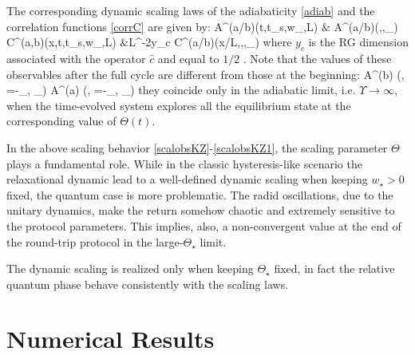 The corresponding dynamic scaling laws of the adiabaticity \eqref{adiab} and the 
correlation functions \eqref{corrC} are given by:
	A^{(a/b)}(t,t_s,w_\star,L) &\simeq 
		{\cal A}^{(a/b)}(\Upsilon,\Theta,\Theta_\star) \cm \\
	\label{scalobsKZ1}
	C^{(a,b)}(x,t,t_s,w_\star,L) &\simeq L^{-2y_c} 
		{\cal C}^{(a/b)}(x/L,\Upsilon,\Theta,\Theta_\star) \pc
\ea
where $y_c$ is the RG dimension associated with the operator $\hat c$ and equal to $1/2$
\cite{S99}. Note that the values of these observables after the full cycle are different
from those at the beginning:
	{\cal A}^{(b)} (\Upsilon, \Theta=-\Theta_\star, \Theta_\star) \neq
	{\cal A}^{(a)} (\Upsilon, \Theta=-\Theta_\star, \Theta_\star) \cm
\ee
they coincide only in the adiabatic limit, i.e. $\Upsilon \to \infty$, when the 
time-evolved system explores all the equilibrium state at the corresponding value of 
$\Theta(t)$.

In the above scaling behavior \eqref{scalobsKZ}-\eqref{scalobsKZ1}, the scaling parameter
$\Theta$ plays a fundamental role. While in the classic hysteresis-like scenario the 
relaxational dynamic lead to a well-defined dynamic scaling when keeping $w_\star > 0$
\cite{tarantelli2022out} fixed, the quantum case is more problematic. The radid 
oscillations, due to the unitary dynamics, make the return somehow chaotic and extremely
sensitive to the protocol parameters. This implies, also, a non-convergent value at the
end of the round-trip protocol in the large-$\Theta_\star$ limit.

The dynamic scaling is realized only when keeping $\Theta_\star$ fixed, in fact the 
relative quantum phase behave consistently with the scaling laws.
 
\section{Numerical Results}

